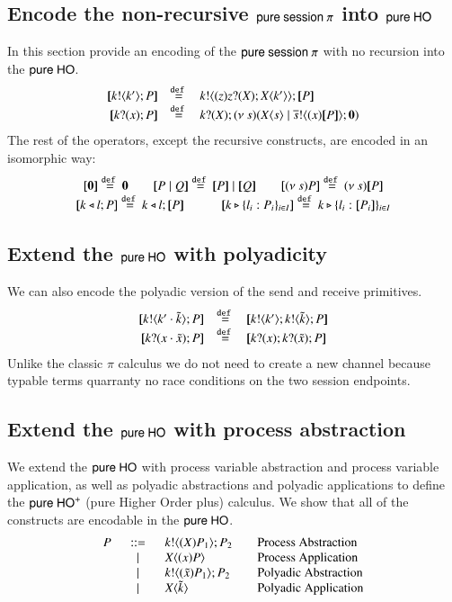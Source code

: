 \subsection{Encode the non-recursive $\mathsf{pure\ session\ }\pi$ into $\mathsf{pure\ HO}$ \label{ss:encnr}}
In this section provide an encoding of the
$\mathsf{pure\ session\ }\pi$ with no recursion into the $\mathsf{pure\ HO}$.
%
\[
	\begin{array}{rcl}
		\map{\bout{k}{k'} P}	&\defeq&	\bout{k}{ \abs{z}{\binp{z}{X} \appl{X}{k'}} } \map{P} \\
		\map{\binp{k}{x} P}	&\defeq&	\binp{k}{X} \newsp{s}{\appl{X}{s} \Par \bout{\dual{s}}{\abs{x} \map{P}} \inact}\\
	\end{array}
\]
%
The rest of the operators, except the recursive constructs, are encoded in an isomorphic way:
\[
	\begin{array}{c}
		\map{\inact} \defeq \inact \qquad \map{P\Par Q} \defeq \map{P} \Par \map{Q} \qquad \map{\news{s} P} \defeq \news{s} \map{P}\\
		\map{\bsel{k}{l} P} \defeq \bsel{k}{l} \map{P} \qquad \quad \map{\bbra{k}{l_i:P_i}_{i \in I}} \defeq \bbra{k}{l_i: \map{P_i}}_{i \in I}
	\end{array}
\]
\subsection{Extend the $\mathsf{pure\ HO}$ with  polyadicity \label{ss:encpp}}
We can also encode the polyadic version of the send and receive primitives.
%
\[
	\begin{array}{rcl}
		\map{\bout{k}{k' \cat \tilde{k}} P}	&\defeq&	\map{\bout{k}{k'} \bout{k}{\tilde{k}} P}\\
		\map{\binp{k}{x \cat \tilde{x}} P}	&\defeq&	\map{\binp{k}{x} \binp{k}{\tilde{x}} P}\\
	\end{array}
\]
%
Unlike the classic $\pi$ calculus we do not need to create a new channel because typable terms
quarranty no race conditions on the two session endpoints.

\subsection{Extend the $\mathsf{pure\ HO}$ with process abstraction\label{ss:encpa}}

We extend the $\mathsf{pure\ HO}$ with process variable abstraction and process variable application,
as well as polyadic abstractions and polyadic applications to define the
$\mathsf{pure\ HO}^+$ (pure Higher Order plus) calculus. We show that all of the
constructs are encodable in the $\mathsf{pure\ HO}$.
%
\[
	\begin{array}{rclcl}
		P &\;\;::=\;\;&	k ! \langle (X)P_1 \rangle ; P_2 & & \textrm{Process Abstraction}\\
		&\;\;\;|\;\;\;&	X\langle (x)P \rangle & & \textrm{Process Application} \\
		&\;\;\;|\;\;\;&	k ! \langle (\tilde{x})P_1 \rangle ; P_2 & & \textrm{Polyadic Abstraction}\\
		&\;\;\;|\;\;\;&	X\langle \tilde{k} \rangle & & \textrm{Polyadic Application}\\
	\end{array}
\]
